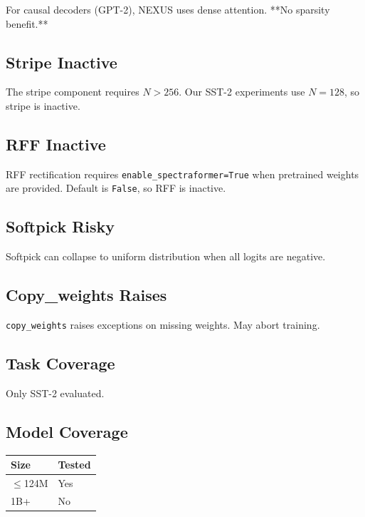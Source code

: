 For causal decoders (GPT-2), NEXUS uses dense attention. **No sparsity 
benefit.**

\subsection{Stripe Inactive}

The stripe component requires $N > 256$. Our SST-2 experiments use 
$N = 128$, so stripe is inactive.

\subsection{RFF Inactive}

RFF rectification requires \texttt{enable\_spectraformer=True} when pretrained 
weights are provided. Default is \texttt{False}, so RFF is inactive.

\subsection{Softpick Risky}

Softpick can collapse to uniform distribution when all logits are negative.

\subsection{Copy\_weights Raises}

\texttt{copy\_weights} raises exceptions on missing weights. May abort training.

\subsection{Task Coverage}

Only SST-2 evaluated.

\subsection{Model Coverage}

\begin{table}[H]
\centering
\small
\begin{tabular}{ll}
\toprule
\textbf{Size} & \textbf{Tested} \\
\midrule
$\le$124M & Yes \\
1B+ & No \\
\bottomrule
\end{tabular}
\end{table}

